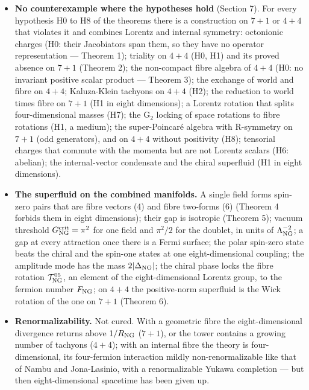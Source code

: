 \documentclass[
  10pt,
]{article}
\providecommand{\tightlist}{%
  \setlength{\itemsep}{0pt}\setlength{\parskip}{0pt}}
\begin{document}
\begin{itemize}
\tightlist
\item
  \textbf{No counterexample where the hypotheses hold} (Section 7). For
  every hypothesis H0 to H8 of the theorems there is a construction on
  \(7+1\) or \(4+4\) that violates it and combines Lorentz and internal
  symmetry: octonionic charges (H0: their Jacobiators span them, so they
  have no operator representation --- Theorem 1); triality on \(4+4\)
  (H0, H1) and its proved absence on \(7+1\) (Theorem 2); the
  non-compact fibre algebra of \(4+4\) (H0: no invariant positive scalar
  product --- Theorem 3); the exchange of world and fibre on \(4+4\);
  Kaluza-Klein tachyons on \(4+4\) (H2); the reduction to world times
  fibre on \(7+1\) (H1 in eight dimensions); a Lorentz rotation that
  splits four-dimensional masses (H7); the \(\mathrm G_2\) locking of
  space rotations to fibre rotations (H1, a medium); the super-Poincaré
  algebra with R-symmetry on \(7+1\) (odd generators), and on \(4+4\)
  without positivity (H8); tensorial charges that commute with the
  momenta but are not Lorentz scalars (H6: abelian); the internal-vector
  condensate and the chiral superfluid (H1 in eight dimensions).
\item
  \textbf{The superfluid on the combined manifolds.} A single field
  forms spin-zero pairs that are fibre vectors (4) and fibre two-forms
  (6) (Theorem 4 forbids them in eight dimensions); their gap is
  isotropic (Theorem 5); vacuum threshold
  \(G^{\rm crit}_{\rm NG}=\pi^2\) for one field and \(\pi^2/2\) for the
  doublet, in units of \(\Lambda_{\rm NG}^{-2}\); a gap at every
  attraction once there is a Fermi surface; the polar spin-zero state
  beats the chiral and the spin-one states at one eight-dimensional
  coupling; the amplitude mode has the mass
  \(2\lvert\Delta_{\rm NG}\rvert\); the chiral phase locks the fibre
  rotation \(\mathcal T^{05}_{\rm NG}\), an element of the
  eight-dimensional Lorentz group, to the fermion number \(F_{\rm NG}\);
  on \(4+4\) the positive-norm superfluid is the Wick rotation of the
  one on \(7+1\) (Theorem 6).
\item
  \textbf{Renormalizability.} Not cured. With a geometric fibre the
  eight-dimensional divergence returns above \(1/R_{\rm NG}\) (\(7+1\)),
  or the tower contains a growing number of tachyons (\(4+4\)); with an
  internal fibre the theory is four-dimensional, its four-fermion
  interaction mildly non-renormalizable like that of Nambu and
  Jona-Lasinio, with a renormalizable Yukawa completion --- but then
  eight-dimensional spacetime has been given up.
\end{itemize}
\end{document}
